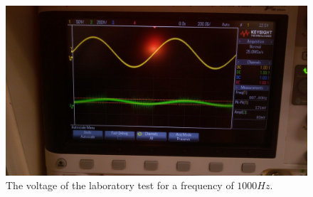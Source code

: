 \begin{figure}[H] 
\centering
\includegraphics[width=0.6\linewidth]{1000Hz.jpeg}
\caption{The voltage of the laboratory test for a frequency of $1000Hz$.}
\label{Fig11: 1000Hz}
\end{figure}
